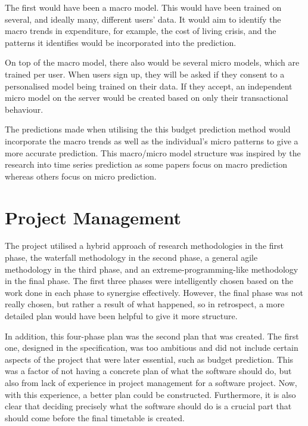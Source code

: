 The first would have been a macro model. This would have been trained on several, and ideally many, different users' data. It would aim to identify the macro trends in expenditure, for example, the cost of living crisis, and the patterns it identifies would be incorporated into the prediction.

On top of the macro model, there also would be several micro models, which are trained per user. When users sign up, they will be asked if they consent to a personalised model being trained on their data. If they accept, an independent micro model on the server would be created based on only their transactional behaviour.

The predictions made when utilising the this budget prediction method would incorporate the macro trends as well as the individual's micro patterns to give a more accurate prediction. This macro/micro model structure was inspired by the research into time series prediction as some papers focus on macro prediction whereas others focus on micro prediction.

\section{Project Management}
The project utilised a hybrid approach of research methodologies in the first phase, the waterfall methodology in the second phase, a general agile methodology in the third phase, and an extreme-programming-like methodology in the final phase. The first three phases were intelligently chosen based on the work done in each phase to synergise effectively. However, the final phase was not really chosen, but rather a result of what happened, so in retrospect, a more detailed plan would have been helpful to give it more structure.

In addition, this four-phase plan was the second plan that was created. The first one, designed in the specification, was too ambitious and did not include certain aspects of the project that were later essential, such as budget prediction. This was a factor of not having a concrete plan of what the software should do, but also from lack of experience in project management for a software project. Now, with this experience, a better plan could be constructed. Furthermore, it is also clear that deciding precisely what the software should do is a crucial part that should come before the final timetable is created.